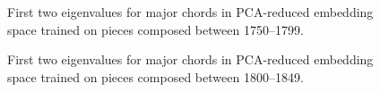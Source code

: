 \begin{figure}
 \centerline{}
 \caption{First two eigenvalues for major chords in PCA-reduced embedding space trained on pieces composed between 1750--1799.}
 \label{fig:1750_majors}
\end{figure}


\begin{figure}
 \centerline{}
 \caption{First two eigenvalues for major chords in PCA-reduced embedding space trained on pieces composed between 1800--1849.}
 \label{fig:1800_majors}
\end{figure}


